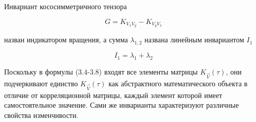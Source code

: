 Инвариант кососимметричного тензора

\begin{equation}
\label{eq:equation3_7}
G=K_{{V_{x}V_{y}}}-K_{{V_{y}V_{x}}}
\end{equation} 

назван индикатором вращения, а сумма $\lambda_{1,2}$ названа линейным инвариантом $I_1$ 

\begin{equation}
\label{eq:equation3_8}
I_1=\lambda_{1}+\lambda_{2}
\end{equation}

Поскольку в формулы (3.4-3.8) входят все элементы матрицы $K_{\vec{V}}(\tau)$, они подчеркивают единство $K_{\vec{V}}(\tau)$ как абстрактного математического объекта в отличие от корреляционной матрицы, каждый элемент которой имеет самостоятельное значение. Сами же инварианты характеризуют различные свойства изменчивости.
